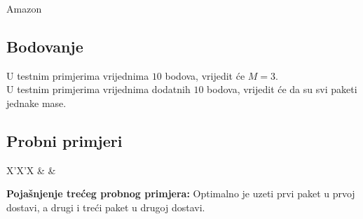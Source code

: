 \begin{statement}[
  problempoints=30,
  timelimit=1 sekunda,
  memorylimit=512 MiB,
]{Amazon}
\subsection*{Bodovanje}
U testnim primjerima vrijednima $10$ bodova, vrijedit će $M=3$.\\
U testnim primjerima vrijednima dodatnih $10$ bodova, vrijedit će da su svi
paketi jednake mase.

\subsection*{Probni primjeri}
\begin{tabularx}{\textwidth}{X'X'X}
 &
 &
\end{tabularx}

\textbf{Pojašnjenje trećeg probnog primjera:}
Optimalno je uzeti prvi paket u prvoj dostavi, a drugi i treći paket u drugoj
dostavi.

\end{statement}

